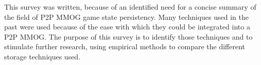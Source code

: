 \documentclass[10pt,a4paper,journal,cspaper,compsoc]{IEEEtran}
\begin{document}
This survey was written, because of an identified need for a concise summary of the field of P2P MMOG game state persistency. Many techniques used in
the past were used because of the ease with which they could be integrated into a P2P MMOG. The purpose of this survey is to identify those
techniques and to stimulate further research, using empirical methods to compare the different storage techniques used.




\end{document}
